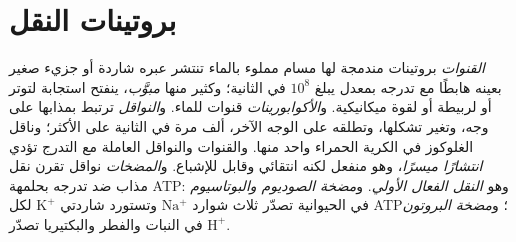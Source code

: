 \section{بروتينات النقل}

\begin{definition}\label{def:b1:membranes-transport:transporters}
\emph{القنوات} بروتينات مندمجة لها مسام مملوء بالماء
تنتشر عبره شاردة أو جزيء صغير بعينه هابطًا مع تدرجه بمعدل يبلغ
$10^8$ في الثانية؛ وكثير منها \emph{مبوَّب}، ينفتح استجابة لتوتر أو
لربيطة أو لقوة ميكانيكية. و\emph{الأكوابورينات}
قنوات للماء. و\emph{النواقل} ترتبط بمذابها على وجه، وتغير
تشكلها، وتطلقه على الوجه الآخر، ألف مرة في الثانية على الأكثر؛ وناقل
الغلوكوز في الكرية الحمراء واحد منها. والقنوات والنواقل العاملة مع
التدرج تؤدي \emph{انتشارًا ميسرًا}، وهو منفعل
لكنه انتقائي وقابل للإشباع. و\emph{المضخات} نواقل تقرن
نقل مذاب ضد تدرجه بحلمهة ATP: وهو \emph{النقل الفعال
الأولي}. و\emph{مضخة الصوديوم
والبوتاسيوم} في  الحيوانية
تصدّر ثلاث شوارد $\mathrm{Na^+}$ وتستورد شاردتي $\mathrm{K^+}$ لكل
ATP؛ و\emph{مضخة البروتون} في  النبات والفطر والبكتيريا تصدّر
$\mathrm{H^+}$.
\end{definition}

